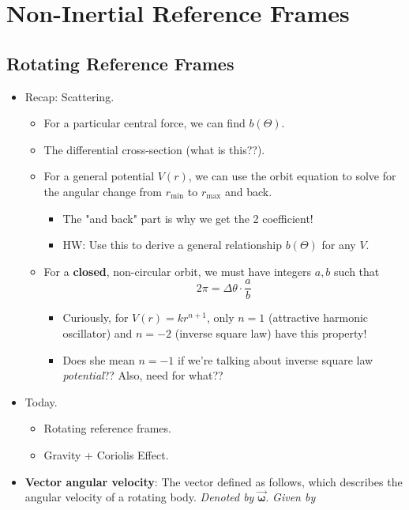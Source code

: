 \documentclass[../notes.tex]{subfiles}
\begin{document}
\chapter{Non-Inertial Reference Frames}
\section{Rotating Reference Frames}
\begin{itemize}
    \item {}Recap: Scattering.
    \begin{itemize}
        \item For a particular central force, we can find $b(\Theta)$.
        \item The differential cross-section (what is this??).
        \item For a general potential $V(r)$, we can use the orbit equation to solve for the angular change from $r_\text{min}$ to $r_\text{max}$ and back.
        \begin{itemize}
            \item The "and back" part is why we get the 2 coefficient!
            \item HW: Use this to derive a general relationship $b(\Theta)$ for any $V$.
        \end{itemize}
        \item For a \textbf{closed}, non-circular orbit, we must have integers $a,b$ such that
        \begin{equation*}
            2\pi = \Delta\theta\cdot\frac{a}{b}
        \end{equation*}
        \begin{itemize}
            \item Curiously, for $V(r)=kr^{n+1}$, only $n=1$ (attractive harmonic oscillator) and $n=-2$ (inverse square law) have this property!
            \item Does she mean $n=-1$ if we're talking about inverse square law \emph{potential}?? Also, need for what??
        \end{itemize}
    \end{itemize}
    \item Today.
    \begin{itemize}
        \item Rotating reference frames.
        \item Gravity + Coriolis Effect.
    \end{itemize}
    \item \textbf{Vector angular velocity}: The vector defined as follows, which describes the angular velocity of a rotating body. \emph{Denoted by} $\bm{\vec{\omega}}$. \emph{Given by}

\end{itemize}
\end{document}
